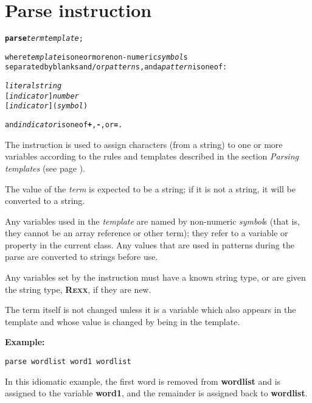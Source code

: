 \chapter{Parse instruction}\label{refparse}
\begin{shaded}
\begin{alltt}
\textbf{parse} \emph{term} \emph{template};

where \emph{template} is one or more non-numeric \emph{symbol}s
separated by blanks and/or \emph{pattern}s, and a \emph{pattern} is one of:

    \emph{literalstring}
    [\emph{indicator}] \emph{number}
    [\emph{indicator}] (\emph{symbol})

and \emph{indicator} is one of \textbf{+}, \textbf{-}, or \textbf{=}.
\end{alltt}
\end{shaded}
 The  instruction is used to assign characters (from a
string) to one or more variables according to the rules and templates
described in the section \emph{Parsing templates} (see page \pageref{refparsing}).
 
The value of the \emph{term} is expected to be a string; if it is
not a string, it will be converted to a string.
 
Any variables used in the \emph{template} are named by non-numeric
\emph{symbol}s (that is, they cannot be an array reference or other
term); they refer to a variable or property in the current class.
Any values that are used in patterns during the parse are converted to
strings before use.
 
Any variables set by the  instruction must have a known
string type, or are given the \nr{} string type, \textbf{R\textsc{exx}}, if
they are new.
 
The term itself is not changed unless it is a variable which also
appears in the template and whose value is changed by being in the
template.

\textbf{Example:}
\begin{lstlisting}
parse wordlist word1 wordlist
\end{lstlisting}
In this idiomatic example, the first word is removed
from \textbf{wordlist} and is assigned to the
variable \textbf{word1}, and the remainder is assigned back
to \textbf{wordlist}.

